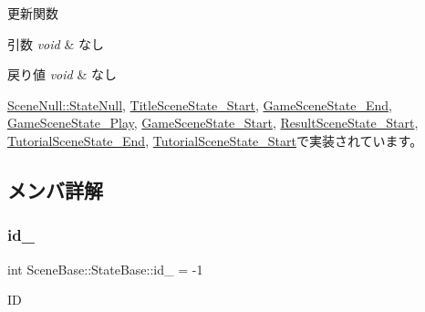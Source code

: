 更新関数 


\begin{DoxyParams}{引数}
{\em void} & なし \\
\hline
\end{DoxyParams}

\begin{DoxyRetVals}{戻り値}
{\em void} & なし \\
\hline
\end{DoxyRetVals}


\mbox{\hyperlink{class_scene_null_1_1_state_null_a835f82c22afb290eca79460450088baf}{Scene\+Null\+::\+State\+Null}}, \mbox{\hyperlink{class_title_scene_state___start_a2e98cf6810711b58766d7147168d02eb}{Title\+Scene\+State\+\_\+\+Start}}, \mbox{\hyperlink{class_game_scene_state___end_a969c3c1ec9618cb495f49bc89bc10067}{Game\+Scene\+State\+\_\+\+End}}, \mbox{\hyperlink{class_game_scene_state___play_a14fa99f6138f6c4ef8598210cdb6cc06}{Game\+Scene\+State\+\_\+\+Play}}, \mbox{\hyperlink{class_game_scene_state___start_ae11bb8d8ea9eae4fea2a9acf33dd1c8b}{Game\+Scene\+State\+\_\+\+Start}}, \mbox{\hyperlink{class_result_scene_state___start_a2ecdef2bef0cd1a04055e8687e11199b}{Result\+Scene\+State\+\_\+\+Start}}, \mbox{\hyperlink{class_tutorial_scene_state___end_a7cdf03fa9a0e41ab86c2b41b8165ad09}{Tutorial\+Scene\+State\+\_\+\+End}}, \mbox{\hyperlink{class_tutorial_scene_state___start_a93c322692bf56172f383d3e5b17cd85c}{Tutorial\+Scene\+State\+\_\+\+Start}}で実装されています。



\subsection{メンバ詳解}
\mbox{\label{class_scene_base_1_1_state_base_a00849bd278a086915752c8a0bd159883}} 
\subsubsection{\texorpdfstring{id\+\_\+}{id\_}}
{\footnotesize\ttfamily int Scene\+Base\+::\+State\+Base\+::id\+\_\+ = -\/1\hspace{0.3cm}{\ttfamily [private]}}



ID 



